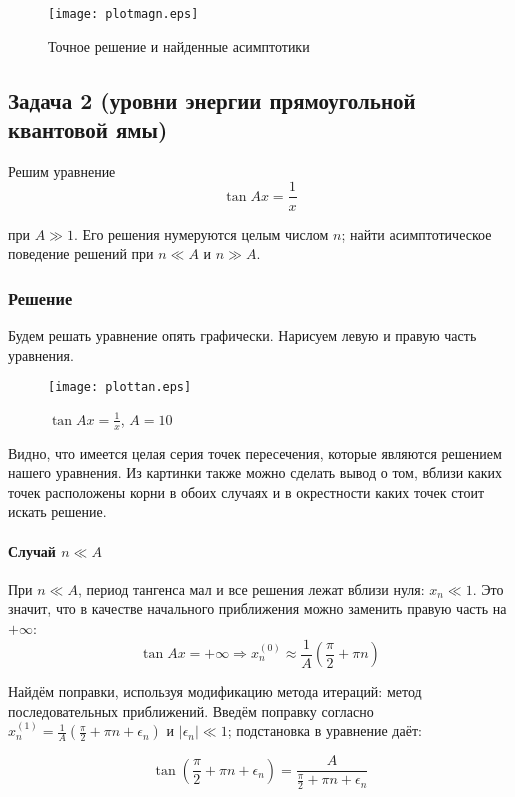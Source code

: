 \documentclass[a4paper,12pt]{article}
\begin{document}
\begin{figure}[h]
	\caption{Точное решение и найденные асимптотики}
	\centering
	\texttt{[image: plotmagn.eps]}
\end{figure}



\subsection*{Задача 2 (уровни энергии прямоугольной квантовой ямы)}

Решим уравнение
\[
\tan Ax=\frac{1}{x}
\]

\noindent
при $A\gg1$. Его решения нумеруются целым числом $n$; найти асимптотическое
поведение решений при $n\ll A$ и $n\gg A$.


\subsubsection*{Решение}

Будем решать уравнение опять графически. Нарисуем левую и правую часть
уравнения.

\begin{figure}[h]
	\caption{$\tan Ax=\frac{1}{x}$, $A=10$}
	\centering
	\texttt{[image: plottan.eps]}
\end{figure}

\noindent
Видно, что имеется целая серия точек пересечения, которые являются
решением нашего уравнения. Из картинки также можно сделать вывод о
том, вблизи каких точек расположены корни в обоих случаях и в окрестности
каких точек стоит искать решение.


\paragraph{Случай $n\ll A$}

При $n\ll A$, период тангенса мал и все решения лежат вблизи нуля:
$x_{n}\ll1$. Это значит, что в качестве начального приближения можно
заменить правую часть на $+\infty$:
\[
\tan Ax=+\infty\Rightarrow x_{n}^{(0)}\approx\frac{1}{A}\left(\frac{\pi}{2}+\pi n\right)
\]

\noindent
Найдём поправки, используя модификацию метода итераций: метод последовательных
приближений. Введём поправку согласно $x_{n}^{(1)}=\frac{1}{A}\left(\frac{\pi}{2}+\pi n+\epsilon_{n}\right)$
и $|\epsilon_{n}|\ll1$; подстановка в уравнение даёт:

\[
\tan\left(\frac{\pi}{2}+\pi n+\epsilon_{n}\right)=\frac{A}{\frac{\pi}{2}+\pi n+\epsilon_{n}}
\]
\end{document}
